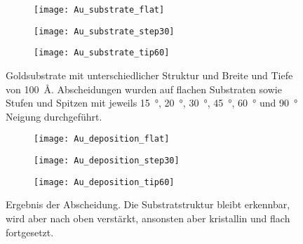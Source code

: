 \begin{figure}[bt]
  \captionsetup[subfigure]{singlelinecheck=false}
  \def\subfigwidth{0.31\textwidth}
  \begin{subfigure}[t]{\subfigwidth}
    \texttt{[image: Au\_substrate\_flat]}
    \label{fig:goldsubstrate-a}
  \end{subfigure}
  \hfill
  \begin{subfigure}[t]{\subfigwidth}
    \texttt{[image: Au\_substrate\_step30]}
    \label{fig:goldsubstrate-b}
  \end{subfigure}
  \hfill
  \begin{subfigure}[t]{\subfigwidth}
    \texttt{[image: Au\_substrate\_tip60]}
    \label{fig:goldsubstrate-c}
  \end{subfigure}
  \caption[Strukturierte Goldsubstrate]{Goldsubstrate mit unterschiedlicher Struktur und Breite und Tiefe von \SI{100}{\angstrom}.
    Abscheidungen wurden auf flachen Substraten sowie Stufen und Spitzen mit jeweils \SI{15}{\degree}, \SI{20}{\degree}, \SI{30}{\degree}, \SI{45}{\degree}, \SI{60}{\degree} und \SI{90}{\degree} Neigung durchgeführt.}
  \label{fig:goldsubstrate}
\end{figure}

\begin{figure}[bt]
  \captionsetup[subfigure]{singlelinecheck=false}
  \def\subfigwidth{0.31\textwidth}
  \begin{subfigure}[t]{\subfigwidth}
    \texttt{[image: Au\_deposition\_flat]}
    \label{fig:golddepositions-a}
  \end{subfigure}
  \hfill
  \begin{subfigure}[t]{\subfigwidth}
    \texttt{[image: Au\_deposition\_step30]}
    \label{fig:golddepositions-b}
  \end{subfigure}
  \hfill
  \begin{subfigure}[t]{\subfigwidth}
    \texttt{[image: Au\_deposition\_tip60]}
    \label{fig:golddepositions-c}
  \end{subfigure}
  \caption[Abscheidung auf strukturierten Substraten]{
    Ergebnis der Abscheidung.
    Die Substratstruktur bleibt erkennbar, wird aber nach oben verstärkt, ansonsten aber kristallin und flach fortgesetzt.
  }
  \label{fig:golddepositions}
\end{figure}

